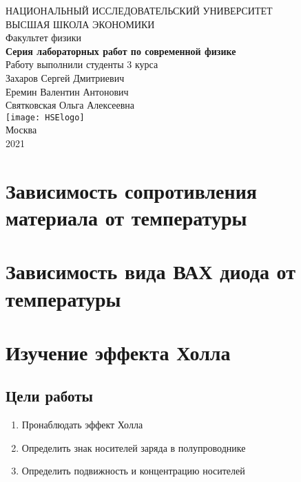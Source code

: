 
	\begin{titlepage}
		\begin{center}
			$$$$
			$$$$
			$$$$
			$$$$
			{\Large{НАЦИОНАЛЬНЫЙ ИССЛЕДОВАТЕЛЬСКИЙ УНИВЕРСИТЕТ}}\\
			\vspace{0.1cm}
			{\Large{ВЫСШАЯ ШКОЛА ЭКОНОМИКИ}}\\
			\vspace{0.25cm}
			{\large{Факультет физики}}\\
			\vspace{5.5cm}
			{\Huge\textbf{{Серия лабораторных работ по современной физике}}}\\%
			\vspace{1cm}
			{Работу выполнили студенты 3 курса}\\
			{Захаров Сергей Дмитриевич}\\
			{Еремин Валентин Антонович}\\
			{Святковская Ольга Алексеевна}\\
			\vfill
			\texttt{[image: HSElogo]}\\
			\vfill
			Москва\\
			2021
		\end{center}
	\end{titlepage}
	
\tableofcontents

\newpage

\section{Зависимость сопротивления материала от температуры}

\section{Зависимость вида ВАХ диода от температуры}

\section{Изучение эффекта Холла}
\subsection{Цели работы}

\begin{enumerate}
	\item Пронаблюдать эффект Холла 
	
	\item Определить знак носителей заряда в полупроводнике 
	
	\item Определить подвижность и концентрацию носителей
	
	
\end{enumerate}
